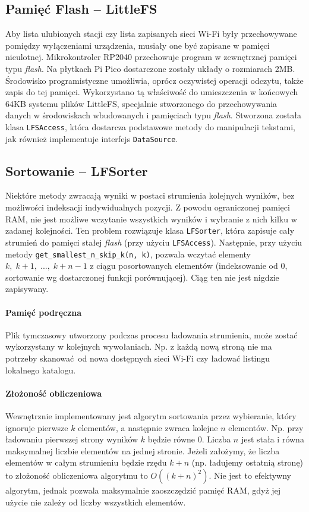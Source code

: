 \documentclass[polish]{aghengthesis}
\begin{document}
		\subsection{Pamięć Flash -- LittleFS}
			Aby lista ulubionych stacji czy lista zapisanych sieci Wi-Fi były przechowywane pomiędzy wyłączeniami urządzenia, musiały one być zapisane w pamięci nieulotnej. Mikrokontroler RP2040 przechowuje program w zewnętrznej pamięci typu \textit{flash}. Na płytkach Pi Pico dostarczone zostały układy o rozmiarach 2MB. Środowisko programistyczne umożliwia, oprócz oczywistej operacji odczytu, także zapis do tej pamięci. Wykorzystano tą właściwość do umieszczenia w końcowych 64KB systemu plików LittleFS\textsuperscript{\cite{littlefs}}, specjalnie stworzonego do przechowywania danych w środowiskach wbudowanych i pamięciach typu \textit{flash}. Stworzona została klasa \lstinline|LFSAccess|, która dostarcza podstawowe metody do manipulacji tekstami, jak również implementuje interfejs \lstinline|DataSource|.
			
		\subsection{Sortowanie -- LFSorter}
			Niektóre metody zwracają wyniki w postaci strumienia kolejnych wyników, bez możliwości indeksacji indywidualnych pozycji. Z powodu ograniczonej pamięci RAM, nie jest możliwe wczytanie wszystkich wyników i wybranie z nich kilku w zadanej kolejności. Ten problem rozwiązuje klasa \lstinline|LFSorter|, która zapisuje cały strumień do pamięci stałej \textit{flash} (przy użyciu \lstinline|LFSAccess|). Następnie, przy użyciu metody \lstinline|get_smallest_n_skip_k(n, k)|, pozwala wczytać elementy $k,\; k+1,\; ...,\; k+n-1$ z ciągu posortowanych elementów (indeksowanie od 0, sortowanie wg dostarczonej funkcji porównującej). Ciąg ten nie jest nigdzie zapisywany.
			
			\paragraph{Pamięć podręczna}
			Plik tymczasowy utworzony podczas procesu ładowania strumienia, może zostać wykorzystany w kolejnych wywołaniach. Np. z każdą nową stroną nie ma potrzeby skanować od nowa dostępnych sieci Wi-Fi czy ładować listingu lokalnego katalogu.
						
			\paragraph{Złożoność obliczeniowa}
			Wewnętrznie implementowany jest algorytm sortowania przez wybieranie, który ignoruje pierwsze $k$ elementów, a następnie zwraca kolejne $n$ elementów. Np. przy ładowaniu pierwszej strony wyników $k$ będzie równe 0. Liczba $n$ jest stała i równa maksymalnej liczbie elementów na jednej stronie. Jeżeli założymy, że liczba elementów w całym strumieniu będzie rzędu $k+n$ (np. ładujemy ostatnią stronę) to złożoność obliczeniowa algorytmu to $O((k+n)^2)$. Nie jest to efektywny algorytm, jednak pozwala maksymalnie zaoszczędzić pamięć RAM, gdyż jej użycie nie zależy od liczby wszystkich elementów.
			
\end{document}
